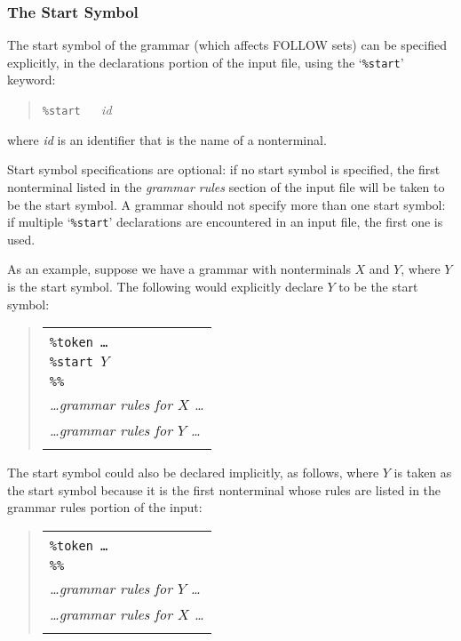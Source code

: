 \documentclass{article}
\begin{document}
\subsubsection{The Start Symbol}

The start symbol of the grammar (which affects FOLLOW sets) can be specified
explicitly, in the declarations portion of the input file, using the 
`{\tt \%start}' keyword: 
%
\begin{quote}
{\tt \%start} $\quad$ {\em id}
\end{quote}
%
where {\em id} is an identifier that is the name of a nonterminal.  

Start symbol specifications are optional: if no start symbol is specified,
the first nonterminal listed in the {\em grammar rules} section of the
input file will be taken to be the start symbol.  A grammar should not
specify more than one start symbol: if multiple `{\tt \%start}' declarations
are encountered in an input file, the first one is used.

As an example, suppose we have a grammar with nonterminals
$X$ and $Y$, where $Y$ is the start symbol.  The following would explicitly
declare $Y$ to be the start symbol:
%
\begin{quote}
\begin{tabular}{|l|}\hline
\begin{minipage}{3.5in}
\ \\
{\tt \%token \ldots}\\
{\tt \%start $Y$}\\
{\tt \%\%}\\
{\em \ldots grammar rules for $X$ \ldots}\\
{\em \ldots grammar rules for $Y$ \ldots}\\
\end{minipage}
\\ \hline
\end{tabular}
\end{quote}
%
The start symbol could also be declared implicitly, as follows, where
$Y$ is taken as the start symbol because it is the first nonterminal whose
rules are listed in the grammar rules portion of the input:
%
\begin{quote}
\begin{tabular}{|l|}\hline
\begin{minipage}{3.5in}
\ \\
{\tt \%token \ldots}\\
{\tt \%\%}\\
{\em \ldots grammar rules for $Y$ \ldots}\\
{\em \ldots grammar rules for $X$ \ldots}\\
\end{minipage}
\\ \hline
\end{tabular}
\end{quote}
\end{document}

